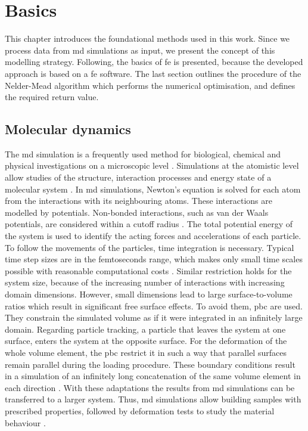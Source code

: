 
\chapter{Basics} \label{chap: basics}

This chapter introduces the foundational methods used in this work. Since we process data from \acrfull{md} simulations as input, we present the concept of this modelling strategy. Following, the basics of \acrshort{fe} is presented, because the developed approach is based on a \acrshort{fe} software. The last section outlines the procedure of the Nelder-Mead algorithm which performs the numerical optimisation, and defines the required return value.

\section{Molecular dynamics} \label{sec: MDBasics}
The \acrshort{md} simulation is a frequently used method for biological, chemical and physical investigations on a microscopic level \cite{tuckerman_understanding_2000}. Simulations at the atomistic level allow studies of the structure, interaction processes and energy state of a molecular system \cite{van_gunsteren_computer_1990}.  
In \acrshort{md} simulations, Newton's equation is solved for each atom from the interactions with its neighbouring atoms. These interactions are modelled by potentials. Non-bonded interactions, such as van der Waals potentials, are considered within a cutoff radius \cite{ries_mechanical_2024}. The total potential energy of the system is used to identify the acting forces and accelerations of each particle. To follow the movements of the particles, time integration is necessary. Typical time step sizes are in the femtoseconds range, which makes only small time scales possible with reasonable computational costs \cite{ries_mechanical_2024}. Similar restriction holds for the system size, because of the increasing number of interactions with increasing domain dimensions. However, small dimensions lead to large surface-to-volume ratios which result in significant free surface effects. To avoid them, \acrfull{pbc} are used. They constrain the simulated volume as if it were integrated in an infinitely large domain. Regarding  particle tracking, a particle that leaves the system at one surface, enters the system at the opposite surface. For the deformation of the whole volume element, the \acrshort{pbc} restrict it in such a way that parallel surfaces remain parallel during the loading procedure. These boundary conditions result in a simulation of an infinitely long concatenation of the same volume element in each direction \cite{gorbunov_periodic_2022}.
With these adaptations the results from \acrshort{md} simulations can be transferred to a larger system. 
Thus, \acrshort{md} simulations allow building samples with prescribed properties, followed by deformation tests to study the material behaviour \cite{buyukozturk_structural_2011}. 

